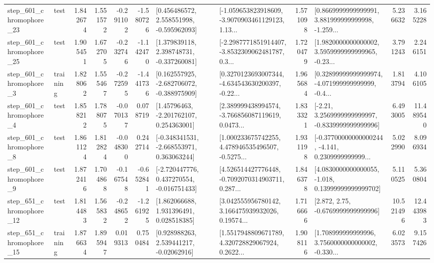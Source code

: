 \begin{tabular}{llrrrrllrlrr}
  step\_601\_chromophore\_23 &      test &      1.842674 &    1.551572 &     -0.291102 & -1.580726 &    [0.456486572, 2.558551998, -0.595962093] &  [-1.059653823918609, -3.9070903461129123, 1.13... &       1.571098 &  [0.8669999999999991, 3.881999999999998, -1.259... &            5.236632 &          3.165228 \\
  step\_601\_chromophore\_25 &      test &      1.905451 &    1.672705 &     -0.232746 & -1.142470 &    [1.379839118, 2.398748731, -0.337260081] &  [-2.2987771851914407, -3.8532309062481787, 0.3... &       1.720479 &  [1.9820000000000002, 3.5959999999999965, -0.23... &            3.791243 &          2.246151 \\
   step\_601\_chromophore\_3 &  training &      1.828062 &    1.555467 &     -0.272595 & -1.441736 &   [0.162557925, -2.682706072, -0.388975909] &  [0.3270123693007344, -4.634543630200397, -0.22... &       1.965684 &  [0.32899999999999974, -4.071999999999999, -0.4... &            1.813794 &          4.106105 \\
   step\_601\_chromophore\_4 &      test &      1.858212 &    1.788075 &     -0.070137 &  0.078719 &     [1.45796463, -2.201762107, 0.254363001] &  [2.389999438994574, -3.766856087119619, 0.0473... &       1.833321 &   [-2.21, 3.2569999999999997, -0.8339999999999996] &            6.493005 &         11.489540 \\
   step\_601\_chromophore\_8 &      test &      1.861124 &    1.812824 &     -0.048300 &  0.242714 &   [-0.348341531, -2.668553971, 0.363063244] &  [1.000233675742255, 4.478946535496507, -0.5275... &       1.931198 &  [-0.37700000000000244, -4.141, 0.2309999999999... &            5.022990 &          8.096934 \\
   step\_601\_chromophore\_9 &      test &      1.872416 &    1.704868 &     -0.167548 & -0.652841 &   [-2.720447776, 0.437270554, -0.016751433] &  [4.526514427776448, -0.7092070314903711, 0.287... &       1.846378 &  [4.0830000000000055, -1.018, 0.13999999999999702] &            5.110525 &          5.360804 \\
  step\_651\_chromophore\_12 &      test &      1.814483 &    1.565832 &     -0.248652 & -1.261925 &     [1.862066688, 1.931396491, 0.028518385] &  [3.042555956780142, 3.166475939932026, 0.19574... &       1.716666 &                 [2.872, 2.75, -0.6769999999999996] &           10.521496 &         12.443983 \\
  step\_651\_chromophore\_15 &  training &      1.876634 &    1.895947 &      0.019313 &  0.750484 &     [0.928988263, 2.539441217, -0.02062916] &  [1.5517948809671789, 4.320728829067924, 0.2622... &       1.908116 &  [1.708999999999996, 3.7560000000000002, -0.330... &            6.023573 &          9.157426 \\

\end{tabular}
